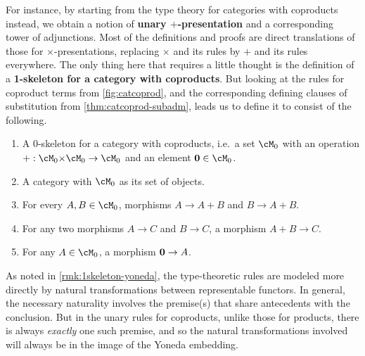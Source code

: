 For instance, by starting from the type theory for categories with coproducts instead, we obtain a notion of \textbf{unary $+$-presentation} and a corresponding tower of adjunctions.
Most of the definitions and proofs are direct translations of those for $\times$-presentations, replacing $\times$ and its rules by $+$ and its rules everywhere.
The only thing here that requires a little thought is the definition of a \textbf{1-skeleton for a category with coproducts}.
But looking at the rules for coproduct terms from \cref{fig:catcoprod},
and the corresponding defining clauses of substitution from \cref{thm:catcoprod-subadm},
leads us to define it to consist of the following.
\begin{enumerate}
\item A 0-skeleton for a category with coproducts, i.e.\ a set $\cM_0$ with an operation $\mathord+:\cM_0\times \cM_0 \to \cM_0$ and an element $\zero\in\cM_0$.
\item A category with $\cM_0$ as its set of objects.
\item For every $A,B\in\cM_0$, morphisms $A\to A+B$ and $B\to A+B$.
\item For any two morphisms $A\to C$ and $B\to C$, a morphism $A+B\to C$.
\item For any $A\in\cM_0$, a morphism $\mathbf{0}\to A$.
\end{enumerate}
As noted in \cref{rmk:1skeleton-yoneda}, the type-theoretic rules are modeled more directly by natural transformations between representable functors.
In general, the necessary naturality involves the premise(s) that share antecedents with the conclusion.
But in the unary rules for coproducts, unlike those for products, there is always \emph{exactly} one such premise, and so the natural transformations involved will always be in the image of the Yoneda embedding.

